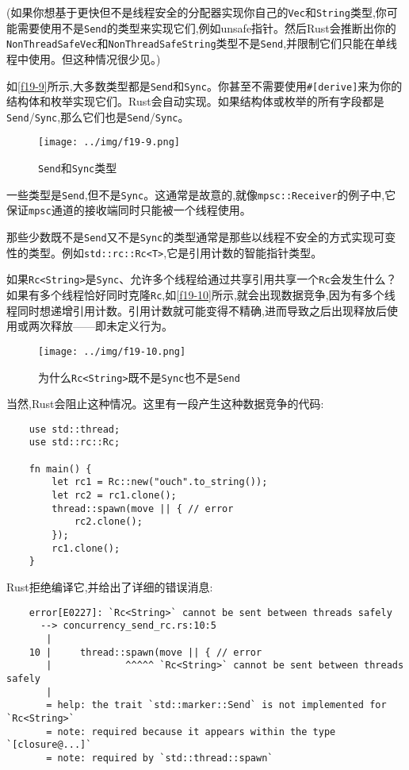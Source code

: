 (如果你想基于更快但不是线程安全的分配器实现你自己的\texttt{Vec}和\texttt{String}类型,你可能需要使用不是\texttt{Send}的类型来实现它们,例如unsafe指针。然后Rust会推断出你的\texttt{NonThreadSafeVec}和\texttt{NonThreadSafeString}类型不是\texttt{Send},并限制它们只能在单线程中使用。但这种情况很少见。)

如\autoref{f19-9}所示,大多数类型都是\texttt{Send}和\texttt{Sync}。你甚至不需要使用\texttt{\#[derive]}来为你的结构体和枚举实现它们。Rust会自动实现。如果结构体或枚举的所有字段都是\texttt{Send}/\texttt{Sync},那么它们也是\texttt{Send}/\texttt{Sync}。

\begin{figure}[htbp]
    \centering
    \texttt{[image: ../img/f19-9.png]}
    \caption{\texttt{Send}和\texttt{Sync}类型}
    \label{f19-9}
\end{figure}

一些类型是\texttt{Send},但不是\texttt{Sync}。这通常是故意的,就像\texttt{mpsc::Receiver}的例子中,它保证\texttt{mpsc}通道的接收端同时只能被一个线程使用。

那些少数既不是\texttt{Send}又不是\texttt{Sync}的类型通常是那些以线程不安全的方式实现可变性的类型。例如\texttt{std::rc::Rc<T>},它是引用计数的智能指针类型。

如果\texttt{Rc<String>}是\texttt{Sync}、允许多个线程给通过共享引用共享一个\texttt{Rc}会发生什么？如果有多个线程恰好同时克隆\texttt{Rc},如\autoref{f19-10}所示,就会出现数据竞争,因为有多个线程同时想递增引用计数。引用计数就可能变得不精确,进而导致之后出现释放后使用或两次释放——即未定义行为。

\begin{figure}[htbp]
    \centering
    \texttt{[image: ../img/f19-10.png]}
    \caption{为什么\texttt{Rc<String>}既不是\texttt{Sync}也不是\texttt{Send}}
    \label{f19-10}
\end{figure}

当然,Rust会阻止这种情况。这里有一段产生这种数据竞争的代码:
\begin{verbatim}
    use std::thread;
    use std::rc::Rc;

    fn main() {
        let rc1 = Rc::new("ouch".to_string());
        let rc2 = rc1.clone();
        thread::spawn(move || { // error
            rc2.clone();
        });
        rc1.clone();
    }
\end{verbatim}

Rust拒绝编译它,并给出了详细的错误消息:
\begin{verbatim}
    error[E0227]: `Rc<String>` cannot be sent between threads safely
      --> concurrency_send_rc.rs:10:5
       |
    10 |     thread::spawn(move || { // error
       |             ^^^^^ `Rc<String>` cannot be sent between threads safely
       |
       = help: the trait `std::marker::Send` is not implemented for `Rc<String>`
       = note: required because it appears within the type `[closure@...]`
       = note: required by `std::thread::spawn`
\end{verbatim}

